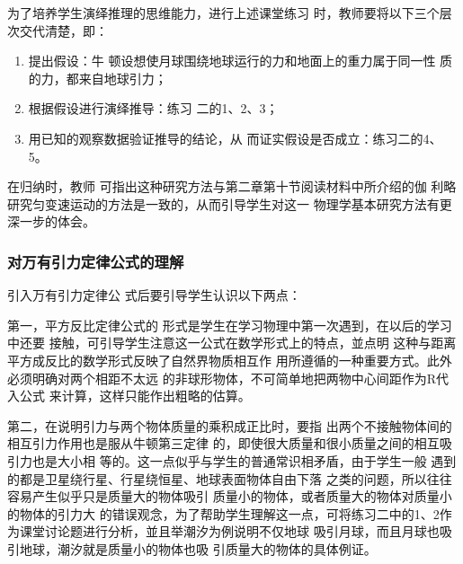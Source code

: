 为了培养学生演绎推理的思维能力，进行上述课堂练习
时，教师要将以下三个层次交代清楚，即：
\begin{enumerate}
    \item 提出假设：牛
顿设想使月球围绕地球运行的力和地面上的重力属于同一性
质的力，都来自地球引力；
\item 根据假设进行演绎推导：练习
二的1、2、3；
\item 用已知的观察数据验证推导的结论，从
而证实假设是否成立：练习二的4、5。
\end{enumerate}

在归纳时，教师
可指出这种研究方法与第二章第十节阅读材料中所介绍的伽
利略研究匀变速运动的方法是一致的，从而引导学生对这一
物理学基本研究方法有更深一步的体会。

\subsubsection{对万有引力定律公式的理解}

引入万有引力定律公
式后要引导学生认识以下两点：

第一，平方反比定律公式的
形式是学生在学习物理中第一次遇到，在以后的学习中还要
接触，可引导学生注意这一公式在数学形式上的特点，並点明
这种与距离平方成反比的数学形式反映了自然界物质相互作
用所遵循的一种重要方式。此外必须明确对两个相距不太远
的非球形物体，不可简单地把两物中心间距作为R代入公式
来计算，这样只能作出粗略的估算。

第二，在说明引力与两个物体质量的乘积成正比时，要指
出两个不接触物体间的相互引力作用也是服从牛顿第三定律
的，即使很大质量和很小质量之间的相互吸引力也是大小相
等的。这一点似乎与学生的普通常识相矛盾，由于学生一般
遇到的都是卫星绕行星、行星绕恒星、地球表面物体自由下落
之类的问题，所以往往容易产生似乎只是质量大的物体吸引
质量小的物体，或者质量大的物体对质量小的物体的引力大
的错误观念，为了帮助学生理解这一点，可将练习二中的1、2作为课堂讨论题进行分析，並且举潮汐为例说明不仅地球
吸引月球，而且月球也吸引地球，潮汐就是质量小的物体也吸
引质量大的物体的具体例证。

